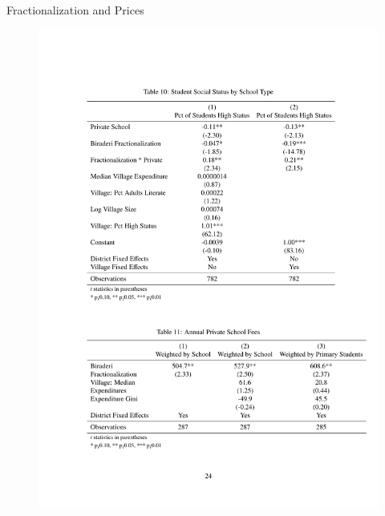 \documentclass{beamer}
\begin{document}
\begin{frame}{Fractionalization and Prices}
	\begin{figure}[htb]
		\begin{center}
		\includegraphics[scale=0.6]{tables/prices.pdf}
		\end{center}
	\end{figure}
\end{frame}
\end{document}
